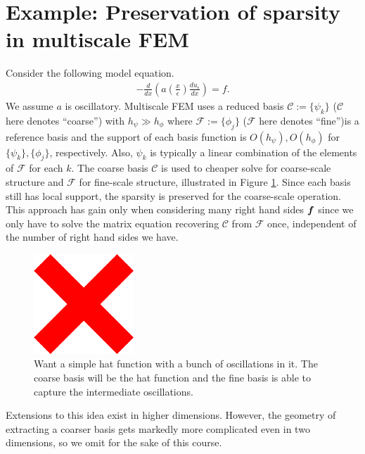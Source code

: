 \section{Example: Preservation of sparsity in multiscale FEM}
Consider the following model equation.
\begin{align} \label{eqn:13:model}
-\frac{d}{dx} \left( a(\frac{x}{\epsilon}) \frac{du_{\epsilon}}{dx} \right) = f.
\end{align}
We assume $a$ is oscillatory. Multiscale FEM uses a reduced basis $\mathcal{C} := \{\psi_{k}\}$ ($\mathcal{C}$ here denotes ``coarse'') with $h_{\psi} \gg h_{\phi}$ where $\mathcal{F} := \{\phi_{j}\}$ ($\mathcal{F}$ here denotes ``fine'')is a reference basis and the support of each basis function is $O(h_{\psi}),O(h_{\phi})$ for $\{\psi_{k}\}, \{\phi_{j}\}$, respectively. Also, $\psi_{k}$ is typically a linear combination of the elements of $\mathcal{F}$ for each $k$. The coarse basis $\mathcal{C}$ is used to cheaper solve for coarse-scale structure and $\mathcal{F}$ for fine-scale structure, illustrated in Figure \ref{fig:13:multiscalefem}. Since each basis still has local support, the sparsity is preserved for the coarse-scale operation. This approach has gain only when considering many right hand sides $\boldsymbol{f}$ since we only have to solve the matrix equation recovering $\mathcal{C}$ from $\mathcal{F}$ once, independent of the number of right hand sides we have.  
\begin{figure}
    \centering
    \includegraphics{images/x.pdf}
    \caption{Want a simple hat function with a bunch of oscillations in it. The coarse basis will be the hat function and the fine basis is able to capture the intermediate oscillations.}
    \label{fig:13:multiscalefem}
\end{figure}
Extensions to this idea exist in higher dimensions. However, the geometry of extracting a coarser basis gets markedly more complicated even in two dimensions, so we omit for the sake of this course. 

